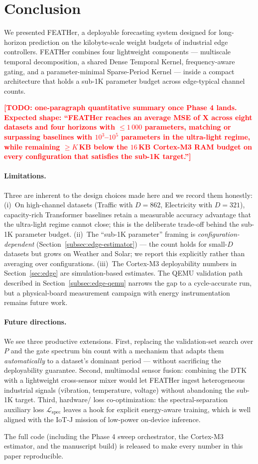 \documentclass[journal]{IEEEtran}
\theoremstyle{remark}
\newcommand{\TODO}[1]{\textcolor{red}{\textbf{[TODO: #1]}}}
\begin{document}
\section{Conclusion}
\label{sec:conclusion}

We presented FEATHer, a deployable forecasting system designed for
long-horizon prediction on the kilobyte-scale weight budgets of
industrial edge controllers. FEATHer combines four lightweight
components --- multiscale temporal decomposition, a shared Dense
Temporal Kernel, frequency-aware gating, and a parameter-minimal
Sparse-Period Kernel --- inside a compact architecture that holds a
sub-1K parameter budget across edge-typical channel counts.

\TODO{one-paragraph quantitative summary once Phase 4 lands.
Expected shape: ``FEATHer reaches an average MSE of X across
eight datasets and four horizons with $\le 1\,000$ parameters,
matching or surpassing baselines with $10^{3}$--$10^{5}$
parameters in the ultra-light regime, while remaining
$\ge K$\,KB below the $16$\,KB Cortex-M3 RAM budget on every
configuration that satisfies the sub-1K target.''}

\paragraph{Limitations.}
Three are inherent to the design choices made here and we record
them honestly:
(i)~On high-channel datasets (Traffic with $D{=}862$, Electricity
with $D{=}321$), capacity-rich Transformer baselines retain a
measurable accuracy advantage that the ultra-light regime cannot
close; this is the deliberate trade-off behind the sub-1K
parameter budget.
(ii)~The ``sub-1K parameter'' framing is
\emph{configuration-dependent} (Section~\ref{subsec:edge-estimator})
--- the count holds for small-$D$ datasets but grows on Weather and
Solar; we report this explicitly rather than averaging over
configurations.
(iii)~The Cortex-M3 deployability numbers in
Section~\ref{sec:edge} are simulation-based estimates. The QEMU
validation path described in Section~\ref{subsec:edge-qemu} narrows
the gap to a cycle-accurate run, but a physical-board measurement
campaign with energy instrumentation remains future work.

\paragraph{Future directions.}
We see three productive extensions.
First, replacing the validation-set search over $P$ and the gate
spectrum bin count with a mechanism that adapts them
\emph{automatically} to a dataset's dominant period --- without
sacrificing the deployability guarantee. Second, multimodal sensor fusion: combining the
DTK with a lightweight cross-sensor mixer would let FEATHer
ingest heterogeneous industrial signals (vibration, temperature,
voltage) without abandoning the sub-1K target. Third, hardware/
loss co-optimization: the spectral-separation auxiliary loss
$\mathcal{L}_{\mathrm{spec}}$ leaves a hook for explicit
energy-aware training, which is well aligned with the IoT-J
mission of low-power on-device inference.

The full code (including the Phase 4 sweep orchestrator,
the Cortex-M3 estimator, and the manuscript build) is released
to make every number in this paper reproducible.



\end{document}

